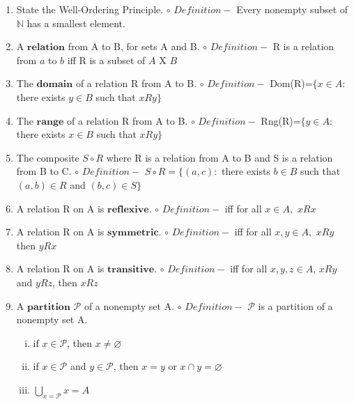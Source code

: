 \documentclass[11pt]{article}
\begin{document}
\begin{enumerate}
    \item State the Well-Ordering Principle.
        \newline $\circ$ $Definition - $ Every nonempty subset of $\mathbb{N}$ has a smallest element.
    \item A $\mathbf{relation}$ from A to B, for sets A and B.
        \newline $\circ$ $Definition - $ R is a relation from $a$ to $b$ iff R is a subset of $A$ X $B$
    \item The $\mathbf{domain}$ of a relation R from A to B.
        \newline $\circ$ $Definition - $ Dom(R)=$\{x\in A:$ there exists $y \in B$ such that $xRy \}$
    \item The $\mathbf{range}$ of a relation R from A to B.
        \newline $\circ$ $Definition - $ Rng(R)=$\{y\in A:$ there exists $x \in B$ such that $xRy \}$
    \item The composite $S \circ R$ where R is a relation from A to B and S is a relation from B to C. 
        \newline $\circ$ $Definition - $ $S \circ R = \{(a,c) :$ there exists $b \in B$ such that $(a,b) \in R$ and $(b,c) \in S \}$
    \item A relation R on A is $\mathbf{reflexive}$.
        \newline $\circ$ $Definition - $ iff for all $x \in A,$ $xRx$
    \item A relation R on A is $\mathbf{symmetric}$.
        \newline $\circ$ $Definition - $ iff for all $x,y \in A,$ $xRy$ then $yRx$
    \item A relation R on A is $\mathbf{transitive}$.
        \newline $\circ$ $Definition - $ iff for all $x,y,z \in A$, $xRy$ and $yRz$, then $xRz$
    \item A $\mathbf{partition}$ $\mathscr{P}$ of a nonempty set A.
        \newline $\circ$ $Definition - $ $\mathscr{P}$ is a partition of a nonempty set A.
        \begin{enumerate}[(i)]
            \item if $x\in \mathscr{P}$, then $x \neq \varnothing$
            \item if $x\in \mathscr{P}$ and $y \in \mathscr{P}$, then $x=y$ or $x \cap y = \varnothing$
            \item $\bigcup_{x = \mathscr{P}} x = A$
        \end{enumerate}

\end{enumerate}
\end{document}
